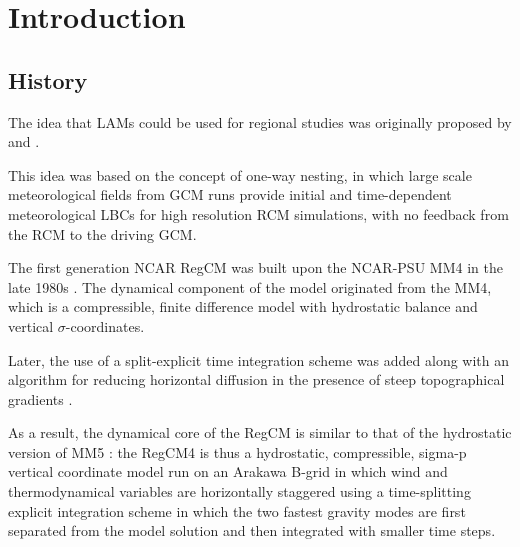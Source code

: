 
\section{Introduction}

\subsection{History}

The idea that \ac{LAMs} could be used for regional studies was originally
proposed by \citet{Dickinson_89} and \citet{Giorgi_90}.

This idea was based on the concept of one-way nesting, in which large scale
meteorological fields from \ac{GCM} runs provide initial and time-dependent
meteorological \ac{LBCs} for high resolution \ac{RCM} simulations, with no
feedback from the \ac{RCM} to the driving \ac{GCM}.

The first generation NCAR \ac{RegCM} was built upon the \ac{NCAR}-\ac{PSU}
\ac{MM4} in the late 1980s \citep{Dickinson_89, Giorgi_89}. The dynamical
component of the model originated from the \ac{MM4}, which is a compressible,
finite difference model with hydrostatic balance and vertical
$\sigma$-coordinates.

Later, the use of a split-explicit time integration scheme was added along
with an algorithm for reducing horizontal diffusion in the presence of steep
topographical gradients \citep{Giorgi_93,Giorgi_93b}.

As a result, the dynamical core of the \ac{RegCM} is similar to that of the
hydrostatic version of \ac{MM5} \citep{Grell_94}: the \ac{RegCM}4 is thus a
hydrostatic, compressible, sigma-p vertical coordinate model run on an
Arakawa B-grid in which wind and thermodynamical variables are horizontally
staggered using a time-splitting explicit integration scheme in which the two
fastest gravity modes are first separated from the model solution and then
integrated with smaller time steps.

